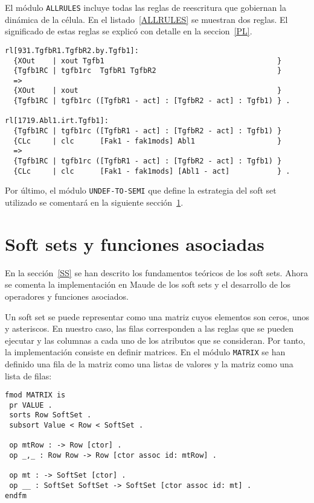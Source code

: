 El módulo \texttt{ALLRULES} incluye todas las reglas de reescritura que gobiernan la dinámica de la célula.
En el listado~\ref{ALLRULES} se muestran dos reglas. El significado de estas reglas se explicó con detalle en la seccion~\ref{PL}.

\begin{lstlisting}[label=ALLRULES,language=Maude,caption={Reglas en el módulo \texttt{ALLRULES}}]
rl[931.TgfbR1.TgfbR2.by.Tgfb1]:
  {XOut    | xout Tgfb1                                        }
  {Tgfb1RC | tgfb1rc  TgfbR1 TgfbR2                            }
  =>
  {XOut    | xout                                              }
  {Tgfb1RC | tgfb1rc ([TgfbR1 - act] : [TgfbR2 - act] : Tgfb1) } .

rl[1719.Abl1.irt.Tgfb1]:
  {Tgfb1RC | tgfb1rc ([TgfbR1 - act] : [TgfbR2 - act] : Tgfb1) }
  {CLc     | clc      [Fak1 - fak1mods] Abl1                   }
  =>
  {Tgfb1RC | tgfb1rc ([TgfbR1 - act] : [TgfbR2 - act] : Tgfb1) }
  {CLc     | clc      [Fak1 - fak1mods] [Abl1 - act]           } .
\end{lstlisting}
\bigskip


Por último, el módulo \texttt{UNDEF-TO-SEMI} que define la estrategia del soft set utilizado se comentará en la siguiente sección~\ref{sec:SoftSets}.



\section{Soft sets y funciones asociadas}
\label{sec:SoftSets}

En la sección~\ref{SS} se han descrito los fundamentos teóricos de los soft sets. 
Ahora se comenta la implementación en Maude de los soft sets y el desarrollo de los operadores y funciones asociados.

Un soft set se puede representar como una matriz cuyos elementos son ceros, unos y asteriscos. En nuestro caso, las filas corresponden a las reglas que se pueden ejecutar y las columnas a cada uno de los atributos que se consideran.
Por tanto, la implementación consiste en definir matrices. En el módulo \texttt{MATRIX} se han definido una fila de la matriz como una listas de valores y la matriz como una lista de filas:

\begin{lstlisting}[language=Maude]
fmod MATRIX is
 pr VALUE .
 sorts Row SoftSet .
 subsort Value < Row < SoftSet .

 op mtRow : -> Row [ctor] .
 op _,_ : Row Row -> Row [ctor assoc id: mtRow] .

 op mt : -> SoftSet [ctor] .
 op __ : SoftSet SoftSet -> SoftSet [ctor assoc id: mt] .
endfm
\end{lstlisting}
\medskip

